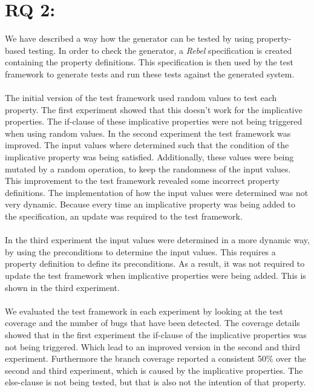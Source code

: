 \section{RQ 2: \rqTwo{}}
We have described a way how the generator can be tested by using property-based
testing. In order to check the generator, a \textit{Rebel} specification is
created containing the property definitions. This specification is then used by
the test framework to generate tests and run these tests against the generated
system.\\
\\
The initial version of the test framework used random values to test each property. The first experiment showed that this doesn't work for the implicative properties. The if-clause of these implicative properties were not being triggered when using random values. In the second experiment the test framework was improved. The input values where determined such that the condition of the implicative property was being satisfied. Additionally, these values were being mutated by a random operation, to keep the randomness of the input values. This improvement to the test framework revealed some incorrect property definitions. The implementation of how the input values were determined was not very dynamic. Because every time an implicative property was being added to the specification, an update was required to the test framework.\\
\\
In the third experiment the input values were determined in a more dynamic way, by using the preconditions to determine the input values. This requires a property definition to define its preconditions. As a result, it was not required to update the test framework when implicative properties were being added. This is shown in the third experiment.\\
\\
We evaluated the test framework in each experiment by looking at the test coverage and the number of bugs that have been detected. The coverage details showed that in the first experiment the if-clause of the implicative properties was not being triggered. Which lead to an improved version in the second and third experiment. Furthermore the branch coverage reported a consistent 50\% over the second and third experiment, which is caused by the implicative properties. The else-clause is not being tested, but that is also not the intention of that property.\\

